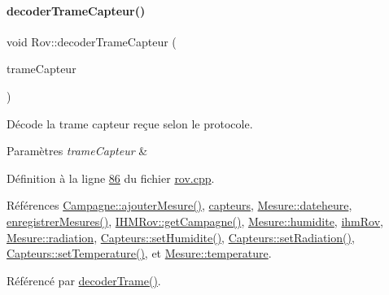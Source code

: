 \paragraph{\texorpdfstring{decoder\+Trame\+Capteur()}{decoderTrameCapteur()}}
{\footnotesize\ttfamily void Rov\+::decoder\+Trame\+Capteur (\begin{DoxyParamCaption}\item[{Q\+String}]{trame\+Capteur }\end{DoxyParamCaption})\hspace{0.3cm}{\ttfamily [private]}}



Décode la trame capteur reçue selon le protocole. 


\begin{DoxyParams}{Paramètres}
{\em trame\+Capteur} & \\
\hline
\end{DoxyParams}


Définition à la ligne \hyperlink{rov_8cpp_source_l00086}{86} du fichier \hyperlink{rov_8cpp_source}{rov.\+cpp}.



Références \hyperlink{campagne_8cpp_source_l00090}{Campagne\+::ajouter\+Mesure()}, \hyperlink{rov_8h_source_l00095}{capteurs}, \hyperlink{campagne_8h_source_l00023}{Mesure\+::dateheure}, \hyperlink{class_rov_a180b955cc5ee7e01196299377e0c5f33}{enregistrer\+Mesures()}, \hyperlink{ihmrov_8cpp_source_l00149}{I\+H\+M\+Rov\+::get\+Campagne()}, \hyperlink{campagne_8h_source_l00024}{Mesure\+::humidite}, \hyperlink{rov_8h_source_l00094}{ihm\+Rov}, \hyperlink{campagne_8h_source_l00026}{Mesure\+::radiation}, \hyperlink{capteurs_8cpp_source_l00029}{Capteurs\+::set\+Humidite()}, \hyperlink{capteurs_8cpp_source_l00034}{Capteurs\+::set\+Radiation()}, \hyperlink{capteurs_8cpp_source_l00024}{Capteurs\+::set\+Temperature()}, et \hyperlink{campagne_8h_source_l00025}{Mesure\+::temperature}.



Référencé par \hyperlink{rov_8cpp_source_l00180}{decoder\+Trame()}.


